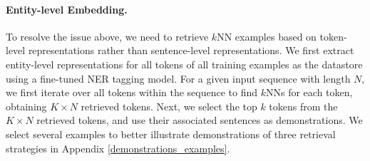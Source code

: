 \documentclass{article}
\begin{document}
\paragraph{Entity-level Embedding.}
\label{entity_level_embedding}
To resolve the issue above, we need to retrieve $k$NN examples based on token-level representations rather than 
sentence-level representations. 
We first extract entity-level representations
for all tokens of all training examples as the datastore 
 using a fine-tuned NER tagging model. 
 For a given input sequence with length $N$, we first iterate over all tokens within the sequence to find $k$NNs for each token, obtaining $K\times N$ retrieved tokens. 
 Next, we select the top $k$ tokens from the 
$K\times N$ retrieved tokens, and use their associated sentences as demonstrations. 
We select several examples to better illustrate demonstrations of three retrieval strategies in Appendix \ref{demonstrations_examples}.
 





\end{document}
